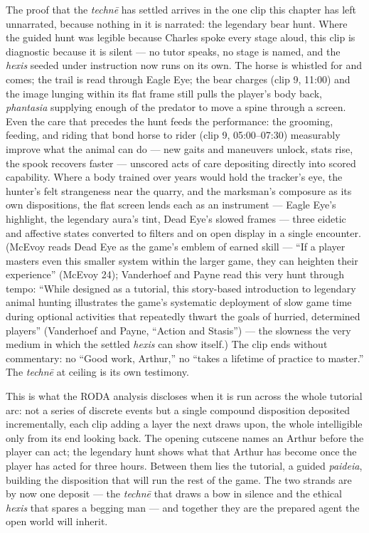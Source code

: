 \documentclass{article}
\begin{document}
The proof that the \textit{technē} has settled arrives in the one clip this chapter has left unnarrated, because nothing in it is narrated: the legendary bear hunt. Where the guided hunt was legible because Charles spoke every stage aloud, this clip is diagnostic because it is silent — no tutor speaks, no stage is named, and the \textit{hexis} seeded under instruction now runs on its own. The horse is whistled for and comes; the trail is read through Eagle Eye; the bear charges (clip 9, 11:00) and the image lunging within its flat frame still pulls the player's body back, \textit{phantasia} supplying enough of the predator to move a spine through a screen. Even the care that precedes the hunt feeds the performance: the grooming, feeding, and riding that bond horse to rider (clip 9, 05:00–07:30) measurably improve what the animal can do — new gaits and maneuvers unlock, stats rise, the spook recovers faster — unscored acts of care depositing directly into scored capability. Where a body trained over years would hold the tracker's eye, the hunter's felt strangeness near the quarry, and the marksman's composure as its own dispositions, the flat screen lends each as an instrument — Eagle Eye's highlight, the legendary aura's tint, Dead Eye's slowed frames — three eidetic and affective states converted to filters and on open display in a single encounter.
(McEvoy reads Dead Eye as the game's emblem of earned skill — ``If a player masters even this smaller system within the larger game, they can heighten their experience'' (McEvoy 24); Vanderhoef and Payne read this very hunt through tempo: ``While designed as a tutorial, this story-based introduction to legendary animal hunting illustrates the game's systematic deployment of slow game time during optional activities that repeatedly thwart the goals of hurried, determined players'' (Vanderhoef and Payne, ``Action and Stasis'') — the slowness the very medium in which the settled \textit{hexis} can show itself.) The clip ends without commentary: no ``Good work, Arthur,'' no ``takes a lifetime of practice to master.'' The \textit{technē} at ceiling is its own testimony.

This is what the RODA analysis discloses when it is run across the whole tutorial arc: not a series of discrete events but a single compound disposition deposited incrementally, each clip adding a layer the next draws upon, the whole intelligible only from its end looking back. The opening cutscene names an Arthur before the player can act; the legendary hunt shows what that Arthur has become once the player has acted for three hours. Between them lies the tutorial, a guided \textit{paideia}, building the disposition that will run the rest of the game. The two strands are by now one deposit — the \textit{technē} that draws a bow in silence and the ethical \textit{hexis} that spares a begging man — and together they are the prepared agent the open world will inherit.
\end{document}

